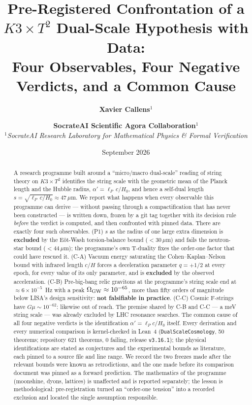 \documentclass[11pt,a4paper]{article}
\title{\Huge \textbf{Pre-Registered Confrontation of a}\\[0.3em]
\LARGE \textbf{$K3\times T^2$ Dual-Scale Hypothesis with Data:}\\[0.2em]
Four Observables, Four Negative Verdicts, and a Common Cause}
\author{\textbf{Xavier Callens}$^{1}$ \and \textbf{SocrateAI Scientific Agora Collaboration}$^{1}$ \\[0.5em]
$^{1}$\textit{SocrateAI Research Laboratory for Mathematical Physics \& Formal Verification}}
\date{September 2026}
\theoremstyle{remark}
\begin{document}
\maketitle

\begin{abstract}
A research programme built around a ``micro/macro dual-scale'' reading of string theory on
$K3\times T^2$ identifies the string scale with the geometric mean of the Planck length and the Hubble
radius, $\alpha'=\ell_P\,c/H_0$, and hence a self-dual length $s=\sqrt{\ell_P\,c/H_0}\approx47\,\mu$m.
We report what happens when every observable this programme can derive --- without passing through a
compactification that has never been constructed --- is written down, frozen by a git tag together
with its decision rule \emph{before} the verdict is computed, and then confronted with pinned data.
There are exactly four such observables. (P1) $s$ as the radius of one large extra dimension is
\textbf{excluded} by the E\"ot-Wash torsion-balance bound ($<30\,\mu$m) and fails the neutron-star bound
($<44\,\mu$m); the programme's own T-duality fixes the order-one factor that could have rescued it.
(C-A) Vacuum energy saturating the Cohen--Kaplan--Nelson bound with infrared length $c/H$ forces a
deceleration parameter $q=+1/2$ at every epoch, for every value of its only parameter, and is
\textbf{excluded} by the observed acceleration. (C-B) Pre-big-bang relic gravitons at the programme's
string scale end at $\approx6\times10^{-5}$~Hz with a peak $\Omega_{\rm GW}\approx10^{-65}$, more than fifty
orders of magnitude below LISA's design sensitivity: \textbf{not falsifiable in practice}. (C-C) Cosmic
F-strings have $G\mu\sim10^{-62}$: likewise out of reach. The premise shared by C-B and C-C --- a meV
string scale --- was already excluded by LHC resonance searches. The common cause of all four negative
verdicts is the identification $\alpha'=\ell_P c/H_0$ itself. Every derivation and every numerical
comparison is kernel-checked in Lean~4 (\texttt{DualScaleCosmology}, 50 theorems; repository 621 theorems,
0 failing, release \texttt{v3.16.1}); the physical identifications are stated as conjectures and the
experimental bounds as literature, each pinned to a source file and line range. We record the two freezes
made after the relevant bounds were known as retrodictions, and the one made before its comparison
document was pinned as a forward prediction. The mathematics of the programme (moonshine, dyons, lattices)
is unaffected and is reported separately; the lesson is methodological: pre-registration turned an
``order-one tension'' into a recorded exclusion and located the single assumption responsible.
\end{abstract}
\end{document}
